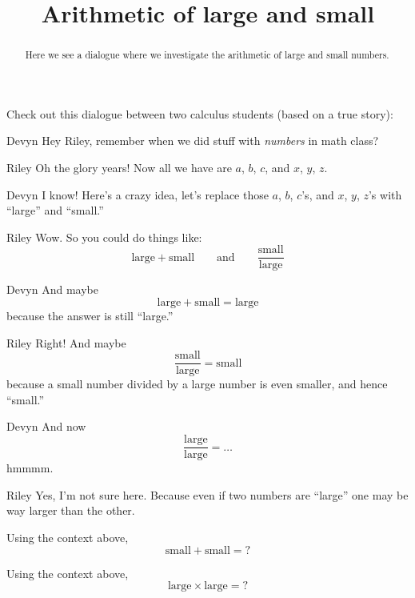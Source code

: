 \documentclass{ximera}
\title[Break-Ground:]{Arithmetic of large and small}
\begin{document}
\begin{abstract}
Here we see a dialogue where we investigate the arithmetic of large
and small numbers.
\end{abstract}
\maketitle


Check out this dialogue between two calculus students (based on a true
story):

\begin{dialogue}
\item[Devyn] Hey Riley, remember when we did stuff with
  \textit{numbers} in math class?
\item[Riley] Oh the glory years! Now all we have are $a$, $b$, $c$, and $x$, $y$, $z$.
\item[Devyn] I know! Here's a crazy idea, let's replace those $a$,
  $b$, $c$'s, and $x$, $y$, $z$'s with ``large'' and ``small.''
\item[Riley] Wow. So you could do things like:
  \[
  \text{large}+\text{small}\qquad\text{and}\qquad \frac{\text{small}}{\text{large}}
  \]
\item[Devyn] And maybe
  \[
  \text{large}+\text{small} = \text{large}
  \]
  because the answer is still ``large.''
\item[Riley] Right! And maybe
  \[
  \frac{\text{small}}{\text{large}} = \text{small}
  \]
  because a small number divided by a large number is even smaller, and hence ``small.''
\item[Devyn] And now
  \[
  \frac{\text{large}}{\text{large}} = \dots
  \]
  hmmmm.
  \item[Riley] Yes, I'm not sure here. Because even if two numbers are
    ``large'' one may be way larger than the other.
\end{dialogue}



\begin{problem}
  Using the context above, 
  \[
  \text{small}+\text{small} = ?
  \]
  \begin{multipleChoice}
  \end{multipleChoice}
\end{problem}


\begin{problem}
  Using the context above, 
  \[
  \text{large}\times\text{large} = ?
  \]
  \begin{multipleChoice}
  \end{multipleChoice}
\end{problem}
\end{document}
